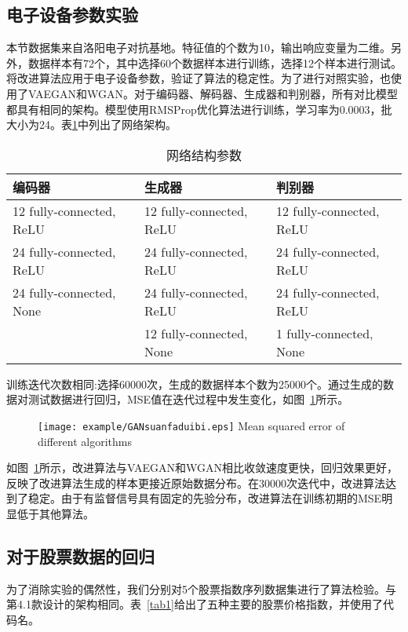 \subsection{电子设备参数实验}

本节数据集来自洛阳电子对抗基地。特征值的个数为10，输出响应变量为二维。另外，数据样本有72个，其中选择60个数据样本进行训练，选择12个样本进行测试。将改进算法应用于电子设备参数，验证了算法的稳定性。为了进行对照实验，也使用了VAEGAN和WGAN。对于编码器、解码器、生成器和判别器，所有对比模型都具有相同的架构。模型使用RMSProp优化算法进行训练，学习率为0.0003，批大小为24。表\ref{tab3}中列出了网络架构。

\begin{table}[hpb]
	\centering
	\caption{网络结构参数}
	\label{tab3}
	\begin{tabular}{lll} \toprule
		编码器   & 生成器 & 判别器  \\  \midrule
		12 fully-connected, ReLU &12 fully-connected, ReLU&12 fully-connected, ReLU\\
		24 fully-connected, ReLU&24 fully-connected, ReLU&24 fully-connected, ReLU\\
		24 fully-connected, None&24 fully-connected, ReLU&24 fully-connected, ReLU\\
		&12 fully-connected, None&1 fully-connected, None\\ \bottomrule
	\end{tabular}
\end{table}

训练迭代次数相同:选择60000次，生成的数据样本个数为25000个。通过生成的数据对测试数据进行回归，MSE值在迭代过程中发生变化，如图~\ref{fig3}所示。

\begin{figure}[htpb]
	\centering
	\texttt{[image: example/GANsuanfaduibi.eps]}
	{Mean squared error of different algorithms}
	\label{fig3}
\end{figure}

如图~\ref{fig3}所示，改进算法与VAEGAN和WGAN相比收敛速度更快，回归效果更好，反映了改进算法生成的样本更接近原始数据分布。在30000次迭代中，改进算法达到了稳定。由于有监督信号具有固定的先验分布，改进算法在训练初期的MSE明显低于其他算法。

\subsection{对于股票数据的回归}

为了消除实验的偶然性，我们分别对5个股票指数序列数据集进行了算法检验。与第4.1款设计的架构相同。表~\ref{tab1}给出了五种主要的股票价格指数，并使用了代码名。

